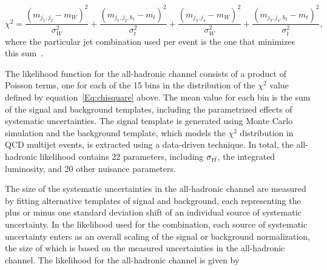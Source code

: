 \begin{equation}\label{Eq:chisquare}
  \chi^2 =  \frac{ \left(m_{j_1, j_2} - m_{W}\right)^2}{\sigma_W^2} + \frac{ \left(m_{j_1, j_2, b_1} - m_{t}\right)^2}{\sigma_t^2} + \frac{ \left(m_{j_3, j_4} - m_{W}\right)^2}{\sigma_W^2} + \frac{ \left(m_{j_3, j_4, b_2} - m_{t}\right)^2}{\sigma_t^2},
  \end{equation}
where the particular jet combination used per event is the one that minimizes this sum~\cite{ALL_HADRONIC_NODE}.

The likelihood function for the all-hadronic channel consists of a product of Poisson terms, 
one for each of the 15 bins in the distribution of the $\chi^2$ value defined by equation~\ref{Eq:chisquare} above. 
The mean value for each bin is the sum of the signal and background templates, including the parametrized effects of systematic uncertainties.
The signal template is generated using Monte Carlo simulation and the background template, which models the $\chi^2$ distribution in QCD multijet events, is extracted using a data-driven technique.
In total, the all-hadronic likelihood contains 22 parameters, including $\sigma_{t\bar{t}}$, the integrated luminosity, and 20 other nuisance parameters.

The size of the systematic uncertainties in the all-hadronic channel are measured by fitting alternative templates of signal and background, 
each representing the plus or minus one standard deviation shift of an individual source of systematic uncertainty.
In the likelihood used for the combination, each source of systematic uncertainty enters as an overall scaling of the signal or background normalization,
the size of which is based on the measured uncertainties in the all-hadronic channel.
The likelihood for the all-hadronic channel is given by

